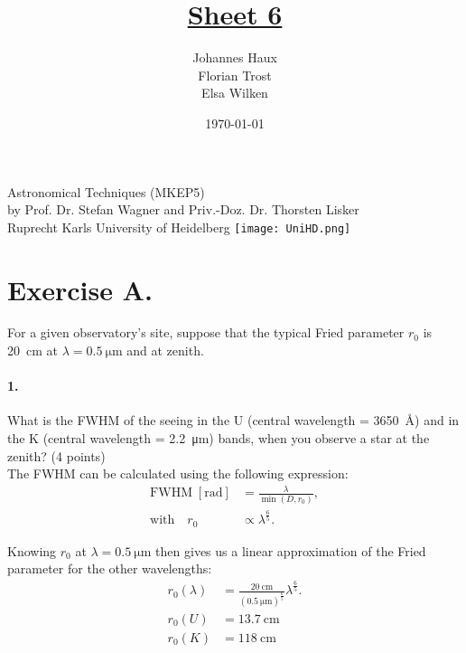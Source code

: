 \documentclass[11pt,a4paper,twoside]{article}
\title{\LARGE \underline {Sheet 6}}
\author{Johannes Haux \\ Florian Trost \\ Elsa Wilken}
\date{\today}
\newcommand{\op}[1]{\operatorname{#1}}
\begin{document}
\maketitle
\thispagestyle{empty}

\begin{center}
  Astronomical Techniques (MKEP5) \\
  \baselineskip35pt
  by Prof. Dr. Stefan Wagner and Priv.-Doz. Dr. Thorsten Lisker \\
  \baselineskip60pt
  Ruprecht Karls University of Heidelberg
\vskip 40pt
\texttt{[image: UniHD.png]}

\end{center}

\newpage
\setcounter{page}{1}		%

\section*{Exercise A.}
For a given observatory's site, suppose that the typical Fried parameter $r_0$
is \SI{20}{\centi\meter} at $\lambda = \SI{0.5}{\micro\meter}$ and at zenith.  

\paragraph{1.} What is the FWHM of the seeing in the U (central wavelength =
\SI{3650}{\angstrom}) and in the K (central wavelength =
\SI{2.2}{\micro\meter}) bands, when you observe a star at the zenith? (4
points) \\

The FWHM can be calculated using the following expression:
\begin{align}
\mathrm{FWHM} \;[\si{\radian}] &= \frac{\lambda}{\op{min}\left(D, r_0 \right)}, \\ \label{eq:S0}
\text{with} \quad r_0 &\propto \lambda^{\frac{6}{5}}.
\end{align}

Knowing $r_0$ at $\lambda = \SI{0.5}{\micro\meter}$ then gives us a linear 
approximation of the Fried parameter for the other wavelengths:
\begin{align}
r_0(\lambda) &= \frac{\SI{20}{\centi\meter}}
                     {\left(\SI{0.5}{\micro\meter}\right)^{\frac{6}{5}}}
                \lambda^{\frac{6}{5}}. \\ \label{eq:r0}
r_0(U) &= \SI{13.7}{\centi\meter}   \\
r_0(K) &= \SI{118}{\centi\meter}
\end{align}
\end{document}
